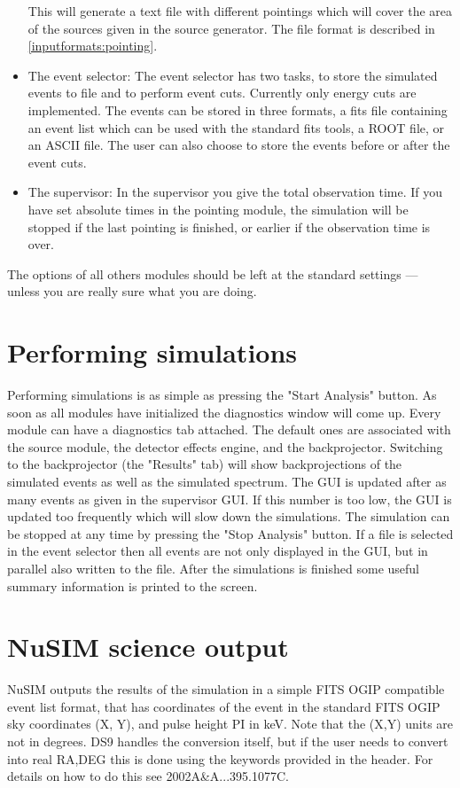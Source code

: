 \begin{itemize}
This will generate a text file with different pointings which will cover the area of the sources given in the source generator. The file format is described in \ref{inputformats:pointing}.
\item The event selector:
The event selector has two tasks, to store the simulated events to file and to perform event cuts.
Currently only energy cuts are implemented.
The events can be stored in three formats, a fits file containing an event list which can be used with the standard fits tools, a ROOT file, or an ASCII file.
The user can also choose to store the events before or after the event cuts.
\item The supervisor:
In the supervisor you give the total observation time. 
If you have set absolute times in the pointing module, the simulation will be stopped if the last pointing is finished, or earlier if the observation time is over. 
\end{itemize}
The options of all others modules should be left at the standard settings --- unless you are really sure what you are doing.


\section{Performing simulations}

Performing simulations is as simple as pressing the "Start Analysis" button. 
As soon as all modules have initialized the diagnostics window will come up. 
Every module can have a diagnostics tab attached. 
The default ones are associated with the source module, the detector effects engine, and the backprojector.
Switching to the backprojector (the "Results" tab) will show backprojections of the simulated events as well as the simulated spectrum.
The GUI is updated after as many events as given in the supervisor GUI.
If this number is too low, the GUI is updated too frequently which will slow down the simulations.
The simulation can be stopped at any time by pressing the "Stop Analysis" button.
If a file is selected in the event selector then all events are not only displayed in the GUI, but in parallel also written to the file.
After the simulations is finished some useful summary information is printed to the screen.

\section{NuSIM science output}

NuSIM outputs the results of the simulation in a simple FITS OGIP compatible event list format, that has coordinates of the event in the standard FITS OGIP sky coordinates (X, Y), and pulse height PI in keV. Note that the (X,Y) units are not in degrees. DS9 handles the conversion itself, but if the user needs to convert into real RA,DEG this is done using the keywords provided in the header. For details on how to do this see 2002A\&A...395.1077C.


